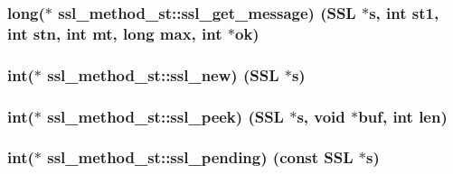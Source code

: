 \subsubsection[{\texorpdfstring{ssl\+\_\+get\+\_\+message}{ssl_get_message}}]{\setlength{\rightskip}{0pt plus 5cm}long($\ast$ ssl\+\_\+method\+\_\+st\+::ssl\+\_\+get\+\_\+message) ({\bf S\+SL} $\ast$s, int st1, int stn, int mt, long max, int $\ast$ok)}\hypertarget{structssl__method__st_a128347c6e6007078bc17af9c64b566f3}{}\label{structssl__method__st_a128347c6e6007078bc17af9c64b566f3}
\subsubsection[{\texorpdfstring{ssl\+\_\+new}{ssl_new}}]{\setlength{\rightskip}{0pt plus 5cm}int($\ast$ ssl\+\_\+method\+\_\+st\+::ssl\+\_\+new) ({\bf S\+SL} $\ast$s)}\hypertarget{structssl__method__st_a7a5b5fc62a1f2d1e130bb67f5da66a81}{}\label{structssl__method__st_a7a5b5fc62a1f2d1e130bb67f5da66a81}
\subsubsection[{\texorpdfstring{ssl\+\_\+peek}{ssl_peek}}]{\setlength{\rightskip}{0pt plus 5cm}int($\ast$ ssl\+\_\+method\+\_\+st\+::ssl\+\_\+peek) ({\bf S\+SL} $\ast$s, void $\ast$buf, int {\bf len})}\hypertarget{structssl__method__st_a4216ad37e9a089392b0fe1915ed745d7}{}\label{structssl__method__st_a4216ad37e9a089392b0fe1915ed745d7}
\subsubsection[{\texorpdfstring{ssl\+\_\+pending}{ssl_pending}}]{\setlength{\rightskip}{0pt plus 5cm}int($\ast$ ssl\+\_\+method\+\_\+st\+::ssl\+\_\+pending) (const {\bf S\+SL} $\ast$s)}\hypertarget{structssl__method__st_a8fd510a866d8754bfd60e897ccb8d3b4}{}\label{structssl__method__st_a8fd510a866d8754bfd60e897ccb8d3b4}
